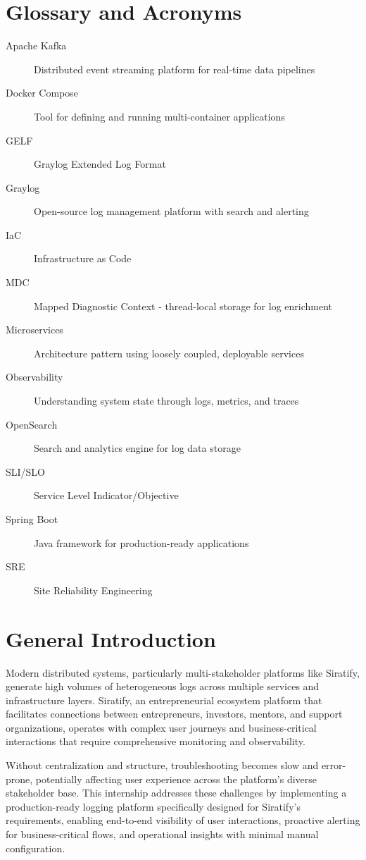 \documentclass[12pt,a4paper]{report}
\begin{document}
\chapter*{Glossary and Acronyms}
\begin{description}
  \item[Apache Kafka] Distributed event streaming platform for real-time data pipelines
  \item[Docker Compose] Tool for defining and running multi-container applications
  \item[GELF] Graylog Extended Log Format
  \item[Graylog] Open-source log management platform with search and alerting
  \item[IaC] Infrastructure as Code
  \item[MDC] Mapped Diagnostic Context - thread-local storage for log enrichment
  \item[Microservices] Architecture pattern using loosely coupled, deployable services
  \item[Observability] Understanding system state through logs, metrics, and traces
  \item[OpenSearch] Search and analytics engine for log data storage
  \item[SLI/SLO] Service Level Indicator/Objective
  \item[Spring Boot] Java framework for production-ready applications
  \item[SRE] Site Reliability Engineering
\end{description}


\tableofcontents
\listoffigures
\clearpage
{}


\clearpage
\chapter*{General Introduction}
Modern distributed systems, particularly multi-stakeholder platforms like Siratify, generate high volumes of heterogeneous logs across multiple services and infrastructure layers. Siratify, an entrepreneurial ecosystem platform that facilitates connections between entrepreneurs, investors, mentors, and support organizations, operates with complex user journeys and business-critical interactions that require comprehensive monitoring and observability.

Without centralization and structure, troubleshooting becomes slow and error-prone, potentially affecting user experience across the platform's diverse stakeholder base. This internship addresses these challenges by implementing a production-ready logging platform specifically designed for Siratify's requirements, enabling end-to-end visibility of user interactions, proactive alerting for business-critical flows, and operational insights with minimal manual configuration.
\end{document}
